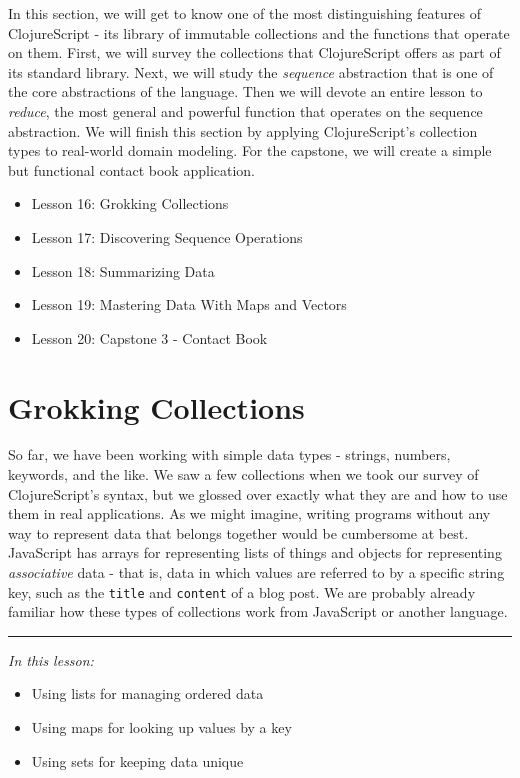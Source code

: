 \documentclass[10pt,twoside,openright]{memoir}
\begin{document}
In this section, we will get to know one of the most distinguishing
features of ClojureScript - its library of immutable collections and the
functions that operate on them. First, we will survey the collections
that ClojureScript offers as part of its standard library. Next, we will
study the \emph{sequence} abstraction that is one of the core
abstractions of the language. Then we will devote an entire lesson to
\emph{reduce}, the most general and powerful function that operates on
the sequence abstraction. We will finish this section by applying
ClojureScript's collection types to real-world domain modeling. For the
capstone, we will create a simple but functional contact book
application.

\begin{itemize}
\tightlist
\item Lesson 16: Grokking Collections
\item Lesson 17: Discovering Sequence Operations
\item Lesson 18: Summarizing Data
\item Lesson 19: Mastering Data With Maps and Vectors
\item Lesson 20: Capstone 3 - Contact Book
\end{itemize}

\chapter{Grokking Collections}

So far, we have been working with simple data types - strings, numbers,
keywords, and the like. We saw a few collections when we took our survey
of ClojureScript's syntax, but we glossed over exactly what they are and
how to use them in real applications. As we might imagine, writing
programs without any way to represent data that belongs together would
be cumbersome at best. JavaScript has arrays for representing lists of
things and objects for representing \emph{associative} data - that is,
data in which values are referred to by a specific string key, such as
the \texttt{title} and \texttt{content} of a blog post. We are probably
already familiar how these types of collections work from JavaScript or
another language.

\begin{center}\rule{0.5\linewidth}{0.5pt}\end{center}

\emph{In this lesson:}

\begin{itemize}
\tightlist
\item
  Using lists for managing ordered data
\item
  Using maps for looking up values by a key
\item
  Using sets for keeping data unique
\end{itemize}
\end{document}
